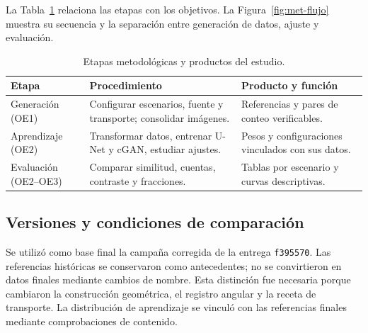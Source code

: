 La Tabla~\ref{tab:met-etapas} relaciona las etapas con los objetivos. La Figura~\ref{fig:met-flujo} muestra su secuencia y la separación entre generación de datos, ajuste y evaluación.
\begin{table}[htbp]\centering\small
\caption{Etapas metodológicas y productos del estudio.}\label{tab:met-etapas}
\begin{tabularx}{\linewidth}{@{}>{\raggedright\arraybackslash}p{2.5cm}>{\raggedright\arraybackslash}X>{\raggedright\arraybackslash}X@{}}\toprule
Etapa & Procedimiento & Producto y función\\\midrule
Generación (OE1) & Configurar escenarios, fuente y transporte; consolidar imágenes. & Referencias y pares de conteo verificables.\\
Aprendizaje (OE2) & Transformar datos, entrenar U-Net y cGAN, estudiar ajustes. & Pesos y configuraciones vinculados con sus datos.\\
Evaluación (OE2--OE3) & Comparar similitud, cuentas, contraste y fracciones. & Tablas por escenario y curvas descriptivas.\\\bottomrule
\end{tabularx}\end{table}

\subsection{Versiones y condiciones de comparación}
Se utilizó como base final la campaña corregida de la entrega \texttt{f395570}. Las referencias históricas se conservaron como antecedentes; no se convirtieron en datos finales mediante cambios de nombre. Esta distinción fue necesaria porque cambiaron la construcción geométrica, el registro angular y la receta de transporte. La distribución de aprendizaje se vinculó con las referencias finales mediante comprobaciones de contenido.

